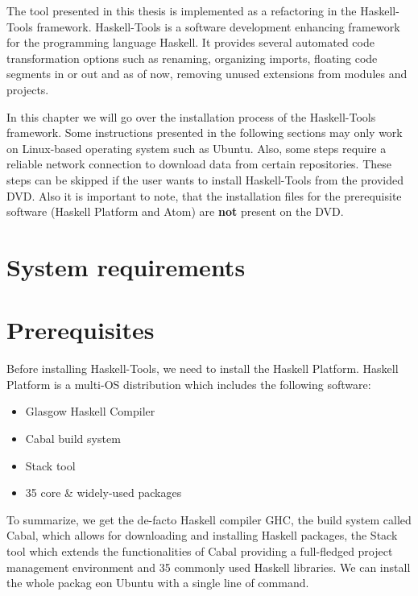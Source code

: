 \documentclass[main.tex]{subfiles}
\begin{document}
	
	The tool presented in this thesis is implemented as a refactoring in the Haskell-Tools framework. Haskell-Tools is a software development enhancing framework for the programming language Haskell. It provides several automated code transformation options such as renaming, organizing imports, floating code segments in or out and as of now, removing unused extensions from modules and projects.
	
	In this chapter we will go over the installation process of the Haskell-Tools framework. Some instructions presented in the following sections may only work on Linux-based operating system such as Ubuntu. Also, some steps require a reliable network connection to download data from certain repositories. These steps can be skipped if the user wants to install Haskell-Tools from the provided DVD. Also it is important to note, that the installation files for the prerequisite software (Haskell Platform and Atom) are \textbf{not} present on the DVD.
	
	\section{System requirements}
	
	\section{Prerequisites}
	
	Before installing Haskell-Tools, we need to install the Haskell Platform. Haskell Platform is a multi-OS distribution which includes the following software:
	
	\begin{itemize}
		\item Glasgow Haskell Compiler
		\item Cabal build system
		\item Stack tool
		\item 35 core \& widely-used packages
	\end{itemize}
	
	To summarize, we get the de-facto Haskell compiler GHC, the build system called Cabal, which allows for downloading and installing Haskell packages, the Stack tool which extends the functionalities of Cabal providing a full-fledged project management environment and 35 commonly used Haskell libraries. We can install the whole packag eon Ubuntu with a single line of command.
	
	
\end{document}
